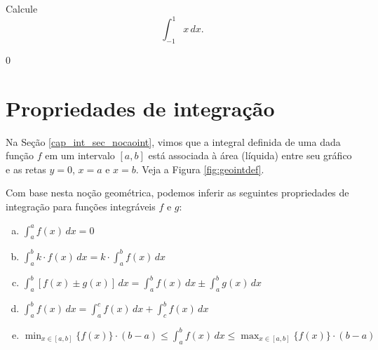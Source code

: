 \begin{exer}
  Calcule
  \begin{equation}
    \int_{-1}^{1} x\,dx.
  \end{equation}
\end{exer}
\begin{resp}
  $0$
\end{resp}

\section{Propriedades de integração}\label{cap_int_sec_propint}

Na Seção \ref{cap_int_sec_nocaoint}, vimos que a integral definida de uma dada função $f$ em um intervalo $[a, b]$ está associada à área (líquida) entre seu gráfico e as retas $y=0$, $x=a$ e $x=b$. Veja a Figura \ref{fig:geointdef}.

Com base nesta noção geométrica, podemos inferir as seguintes propriedades de integração para funções integráveis $f$ e $g$:
\begin{enumerate}[a)]
\item $\displaystyle \int_a^a f(x)\,dx = 0$
\item $\displaystyle \int_a^b k\cdot f(x)\,dx = k\cdot\int_a^b f(x)\,dx$
\item $\displaystyle \int_a^b \left[f(x)\pm g(x)\right]\,dx = \int_a^b f(x)\,dx \pm \int_a^b g(x)\,dx$
\item $\displaystyle \int_a^b f(x)\,dx = \int_a^c f(x)\,dx + \int_c^b f(x)\,dx$
\item $\displaystyle \min_{x\in [a, b]} \{f(x)\}\cdot (b-a) \leq \int_a^b f(x)\,dx \leq \max_{x\in [a, b]} \{f(x)\}\cdot (b-a)$
\end{enumerate}

